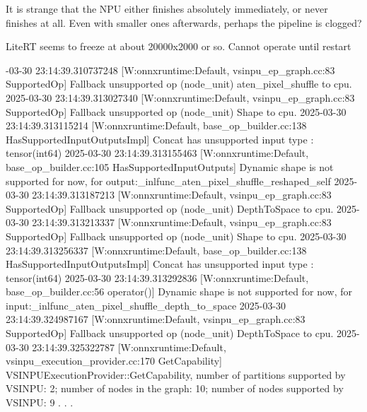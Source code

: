 

It is strange that the NPU either finishes absolutely immediately,
or never finishes at all.
Even with smaller ones afterwards, perhaps the pipeline is clogged?


LiteRT seems to freeze at about 20000x2000 or so.
Cannot operate until restart

-03-30 23:14:39.310737248 [W:onnxruntime:Default, vsinpu_ep_graph.cc:83 SupportedOp] Fallback unsupported op (node_unit) aten_pixel_shuffle  to cpu.
2025-03-30 23:14:39.313027340 [W:onnxruntime:Default, vsinpu_ep_graph.cc:83 SupportedOp] Fallback unsupported op (node_unit) Shape  to cpu.
2025-03-30 23:14:39.313115214 [W:onnxruntime:Default, base_op_builder.cc:138 HasSupportedInputOutputsImpl] Concat has unsupported input type : tensor(int64)
2025-03-30 23:14:39.313155463 [W:onnxruntime:Default, base_op_builder.cc:105 HasSupportedInputOutputs] Dynamic shape is not supported for now, for output:_inlfunc_aten_pixel_shuffle_reshaped_self
2025-03-30 23:14:39.313187213 [W:onnxruntime:Default, vsinpu_ep_graph.cc:83 SupportedOp] Fallback unsupported op (node_unit) DepthToSpace  to cpu.
2025-03-30 23:14:39.313213337 [W:onnxruntime:Default, vsinpu_ep_graph.cc:83 SupportedOp] Fallback unsupported op (node_unit) Shape  to cpu.
2025-03-30 23:14:39.313256337 [W:onnxruntime:Default, base_op_builder.cc:138 HasSupportedInputOutputsImpl] Concat has unsupported input type : tensor(int64)
2025-03-30 23:14:39.313292836 [W:onnxruntime:Default, base_op_builder.cc:56 operator()] Dynamic shape is not supported for now, for input:_inlfunc_aten_pixel_shuffle_depth_to_space
2025-03-30 23:14:39.324987167 [W:onnxruntime:Default, vsinpu_ep_graph.cc:83 SupportedOp] Fallback unsupported op (node_unit) DepthToSpace  to cpu.
2025-03-30 23:14:39.325322787 [W:onnxruntime:Default, vsinpu_execution_provider.cc:170 GetCapability] VSINPUExecutionProvider::GetCapability, number of partitions supported by VSINPU: 2; number of nodes in the graph: 10; number of nodes supported by VSINPU: 9
\endtt
.
.
.

